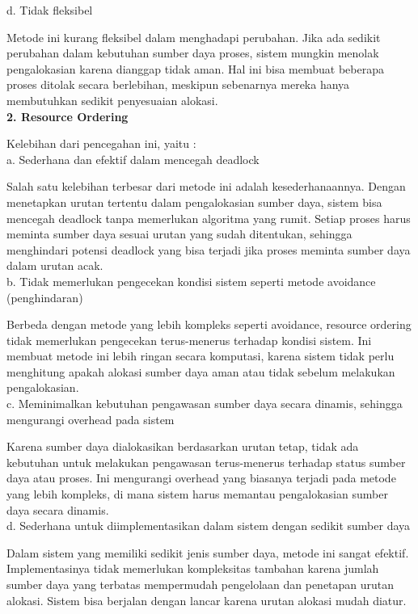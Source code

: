 \documentclass[12pt]{article}
\begin{document}
	d. Tidak fleksibel

    Metode ini kurang fleksibel dalam menghadapi perubahan. Jika ada sedikit perubahan dalam kebutuhan sumber daya proses, sistem mungkin menolak pengalokasian karena dianggap tidak aman. Hal ini bisa membuat beberapa proses ditolak secara berlebihan, meskipun sebenarnya mereka hanya membutuhkan sedikit penyesuaian alokasi.\\

\textbf{2. Resource Ordering\\}

    Kelebihan dari pencegahan ini, yaitu :\\

    a. Sederhana dan efektif dalam mencegah deadlock
    
    Salah satu kelebihan terbesar dari metode ini adalah kesederhanaannya. Dengan menetapkan urutan tertentu dalam pengalokasian sumber daya, sistem bisa mencegah deadlock tanpa memerlukan algoritma yang rumit. Setiap proses harus meminta sumber daya sesuai urutan yang sudah ditentukan, sehingga menghindari potensi deadlock yang bisa terjadi jika proses meminta sumber daya dalam urutan acak.\\

    b. Tidak memerlukan pengecekan kondisi sistem seperti metode avoidance (penghindaran)
    
    Berbeda dengan metode yang lebih kompleks seperti avoidance, resource ordering tidak memerlukan pengecekan terus-menerus terhadap kondisi sistem. Ini membuat metode ini lebih ringan secara komputasi, karena sistem tidak perlu menghitung apakah alokasi sumber daya aman atau tidak sebelum melakukan pengalokasian.\\

    c. Meminimalkan kebutuhan pengawasan sumber daya secara dinamis, sehingga mengurangi overhead pada sistem
    
    Karena sumber daya dialokasikan berdasarkan urutan tetap, tidak ada kebutuhan untuk melakukan pengawasan terus-menerus terhadap status sumber daya atau proses. Ini mengurangi overhead yang biasanya terjadi pada metode yang lebih kompleks, di mana sistem harus memantau pengalokasian sumber daya secara dinamis.\\

    d. Sederhana untuk diimplementasikan dalam sistem dengan sedikit sumber daya
    
    Dalam sistem yang memiliki sedikit jenis sumber daya, metode ini sangat efektif. Implementasinya tidak memerlukan kompleksitas tambahan karena jumlah sumber daya yang terbatas mempermudah pengelolaan dan penetapan urutan alokasi. Sistem bisa berjalan dengan lancar karena urutan alokasi mudah diatur.\\
\end{document}
